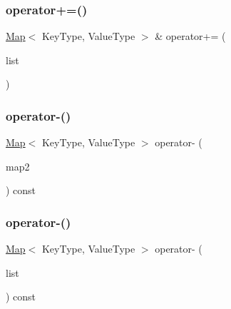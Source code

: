 \mbox{\label{classMap_a42f7fe44b1c670571d749a6a02b9702a}} 
\subsubsection{\texorpdfstring{operator+=()}{operator+=()}\hspace{0.1cm}{\footnotesize\ttfamily [2/2]}}
{\footnotesize\ttfamily \mbox{\hyperlink{classMap}{Map}}$<$ Key\+Type, Value\+Type $>$ \& operator+= (\begin{DoxyParamCaption}\item[{std\+::initializer\+\_\+list$<$ std\+::pair$<$ Key\+Type, Value\+Type $>$ $>$}]{list }\end{DoxyParamCaption})}

\mbox{\label{classMap_a68704368f8cfa5ea173c0dfc95c75920}} 
\subsubsection{\texorpdfstring{operator-\/()}{operator-()}\hspace{0.1cm}{\footnotesize\ttfamily [1/2]}}
{\footnotesize\ttfamily \mbox{\hyperlink{classMap}{Map}}$<$ Key\+Type, Value\+Type $>$ operator-\/ (\begin{DoxyParamCaption}\item[{const \mbox{\hyperlink{classMap}{Map}}$<$ Key\+Type, Value\+Type $>$ \&}]{map2 }\end{DoxyParamCaption}) const}

\mbox{\label{classMap_a47ec48c18c6f07358c8e8810f027984d}} 
\subsubsection{\texorpdfstring{operator-\/()}{operator-()}\hspace{0.1cm}{\footnotesize\ttfamily [2/2]}}
{\footnotesize\ttfamily \mbox{\hyperlink{classMap}{Map}}$<$ Key\+Type, Value\+Type $>$ operator-\/ (\begin{DoxyParamCaption}\item[{std\+::initializer\+\_\+list$<$ std\+::pair$<$ Key\+Type, Value\+Type $>$ $>$}]{list }\end{DoxyParamCaption}) const}

